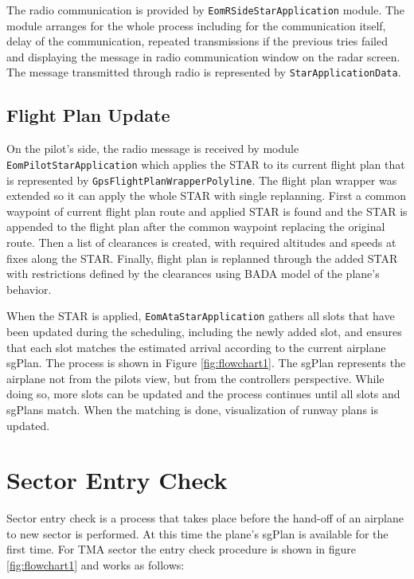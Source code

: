 The radio communication is provided by \texttt{EomRSideStarApplication} module. The module arranges for the whole process including for the communication itself, delay of the communication, repeated transmissions if the previous tries failed and displaying the message in radio communication window on the radar screen. The message transmitted through radio is represented by \texttt{StarApplicationData}.

\subsection{Flight Plan Update}

On the pilot's side, the radio message is received by module \texttt{EomPilotStarApplication} which applies the STAR to its current flight plan that is represented by \texttt{GpsFlightPlan\-WrapperPolyline}. The flight plan wrapper was extended so it can apply the whole STAR with single replanning. First a common waypoint of current flight plan route and applied STAR is found and the STAR is appended to the flight plan after the common waypoint replacing the original route. Then a list of clearances is created, with required altitudes and speeds at fixes along the STAR. Finally, flight plan is replanned  through the added STAR with restrictions defined by the clearances using BADA model of the plane's behavior.

When the STAR is applied, \texttt{EomAtaStarApplication} gathers all slots that have been updated during the scheduling, including the newly added slot, and ensures that each slot matches the estimated arrival according to the current airplane sgPlan. The process is shown in Figure \ref{fig:flowchart1}. The sgPlan represents the airplane not from the pilots view, but from the controllers perspective. While doing so, more slots can be updated and the process continues until all slots and sgPlans match. When the matching is done, visualization of runway plans is updated.

\section{Sector Entry Check}

Sector entry check is a process that takes place before the hand-off of an airplane to new sector is performed. At this time the plane's sgPlan is available for the first time. For TMA sector the entry check procedure is shown in figure \ref{fig:flowchart1} and works as follows:

